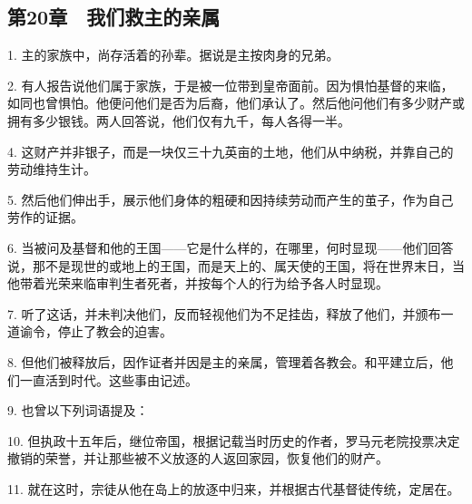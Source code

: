 \subsection{第20章　我们救主的亲属}

1. 主的家族中，尚存活着的孙辈。据说是主按肉身的兄弟。\par

2. 有人报告说他们属于家族，于是被一位带到皇帝面前。因为惧怕基督的来临，如同也曾惧怕。他便问他们是否为后裔，他们承认了。然后他问他们有多少财产或拥有多少银钱。两人回答说，他们仅有九千，每人各得一半。\par

4. 这财产并非银子，而是一块仅三十九英亩的土地，他们从中纳税，并靠自己的劳动维持生计。\par

5. 然后他们伸出手，展示他们身体的粗硬和因持续劳动而产生的茧子，作为自己劳作的证据。\par

6. 当被问及基督和他的王国——它是什么样的，在哪里，何时显现——他们回答说，那不是现世的或地上的王国，而是天上的、属天使的王国，将在世界末日，当他带着光荣来临审判生者死者，并按每个人的行为给予各人时显现。\par

7. 听了这话，并未判决他们，反而轻视他们为不足挂齿，释放了他们，并颁布一道谕令，停止了教会的迫害。\par

8. 但他们被释放后，因作证者并因是主的亲属，管理着各教会。和平建立后，他们一直活到时代。这些事由记述。\par

9. 也曾以下列词语提及：\par

10. 但执政十五年后，继位帝国，根据记载当时历史的作者，罗马元老院投票决定撤销的荣誉，并让那些被不义放逐的人返回家园，恢复他们的财产。\par

11. 就在这时，宗徒从他在岛上的放逐中归来，并根据古代基督徒传统，定居在。\par


